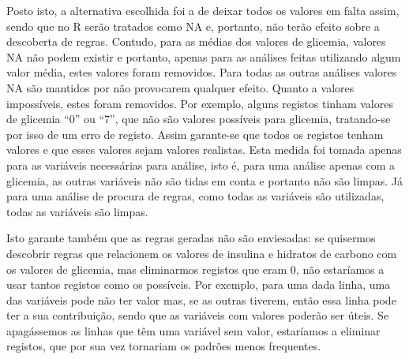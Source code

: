 Posto isto, a alternativa escolhida foi a de deixar todos os valores em falta assim, sendo que no R serão tratados como NA e, portanto, não terão efeito sobre a descoberta de regras. Contudo, para as médias dos valores de glicemia, valores NA não podem existir e portanto, apenas para as análises feitas utilizando algum valor média, estes valores foram removidos. Para todas as outras análises valores NA são mantidos por não provocarem qualquer efeito. Quanto a valores impossíveis, estes foram removidos. Por exemplo, alguns registos tinham valores de glicemia ``0'' ou ``7'', que não são valores possíveis para glicemia, tratando-se por isso de um erro de registo.
Assim garante-se que todos os registos tenham valores e que esses valores sejam valores realistas. Esta medida foi tomada apenas para as variáveis necessárias para análise, isto é, para uma análise apenas com a glicemia, as outras variáveis não são tidas em conta e portanto não são limpas. Já para uma análise de procura de regras, como todas as variáveis são utilizadas, todas as variáveis são limpas. 

Isto garante também que as regras geradas não são enviesadas: se quisermos descobrir regras que relacionem os valores de insulina e hidratos de carbono com os valores de glicemia, mas eliminarmos registos que eram 0, não estaríamos a usar tantos registos como os possíveis. Por exemplo, para uma dada linha, uma das variáveis pode não ter valor mas, se as outras tiverem, então essa linha pode ter a sua contribuição, sendo que as variáveis com valores poderão ser úteis. Se apagássemos as linhas que têm uma variável sem valor, estaríamos a eliminar registos, que por sua vez tornariam os padrões menos frequentes.


